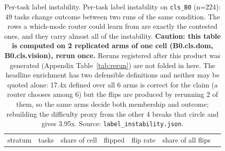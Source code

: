 \begin{table}[tp]
\centering
\caption{Per-task label instability. Per-task label instability on \texttt{cls\_B0} (n=224): 49 tasks change outcome between two runs of the same condition. The rows a which-mode router could learn from are exactly the contested ones, and they carry almost all of the instability. \textbf{Caution: this table is computed on 2 replicated arms of one cell (B0.cls.dom, B0.cls.vision), rerun once.} Reruns registered after this product was generated (Appendix Table~\ref{tab:rerun}) are not folded in here. The headline enrichment has two defensible definitions and neither may be quoted alone: 17.4x defined over all 6 arms is correct for the claim (a router chooses among 6) but the flips are produced by rerunning 2 of them, so the same arms decide both membership and outcome; rebuilding the difficulty proxy from the other 4 breaks that circle and gives 3.95x. Source: \texttt{label\_instability.json}.}
\label{tab:t27}
\footnotesize
\setlength{\tabcolsep}{3pt}
\begin{tabular}{@{}
  >{\raggedright\arraybackslash}p{}
  >{\raggedright\arraybackslash}p{}
  >{\raggedright\arraybackslash}p{}
  >{\raggedright\arraybackslash}p{}
  >{\raggedright\arraybackslash}p{}
  >{\raggedright\arraybackslash}p{}
  >{\raggedright\arraybackslash}p{}@{}}
\toprule
\begin{minipage}[b]{\linewidth}\raggedright
stratum
\end{minipage} & \begin{minipage}[b]{\linewidth}\raggedright
tasks
\end{minipage} & \begin{minipage}[b]{\linewidth}\raggedright
share of cell
\end{minipage} & \begin{minipage}[b]{\linewidth}\raggedright
flipped
\end{minipage} & \begin{minipage}[b]{\linewidth}\raggedright
flip rate
\end{minipage} & \begin{minipage}[b]{\linewidth}\raggedright
share of all flips

\end{minipage}
\end{tabular}
\end{table}
